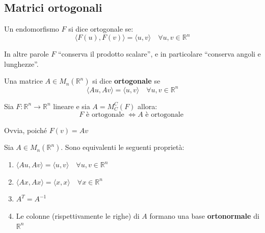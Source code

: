 \documentclass[
  a4paper,
]{article}
\providecommand{\tightlist}{%
  \setlength{\itemsep}{0pt}\setlength{\parskip}{0pt}}
\providecommand{\tightlist}{}
\begin{document}
\hypertarget{matrici-ortogonali}{%
\subsection{Matrici ortogonali}\label{matrici-ortogonali}}

\begin{definitionbox}
Un endomorfismo \(F\) si dice ortogonale se: \[
\langle F(u), F(v) \rangle = \langle u, v \rangle \quad \forall u, v \in \mathbb{R}^n
\]
\end{definitionbox}

In altre parole \(F\) ``conserva il prodotto scalare'', e in particolare
``conserva angoli e lunghezze''.

\begin{definitionbox}
Una matrice \(A \in M_n (\mathbb{R}^n)\) si dice \textbf{ortogonale} se
\[
\langle Au, Av \rangle = \langle u, v \rangle \quad \forall u, v \in \mathbb{R}^n
\]
\end{definitionbox}

\begin{propositionbox}
Sia \(F: \mathbb{R}^n \to \mathbb{R}^n\) lineare e sia \(A = M_C^C(F)\)
allora: \[
F \text{ è ortogonale } \iff A \text { è ortogonale }
\]
\end{propositionbox}

\begin{proofbox}
Ovvia, poiché \(F(v) = Av\)
\end{proofbox}

\begin{propositionbox}
Sia \(A \in M_n (\mathbb{R}^n)\). Sono equivalenti le seguenti
proprietà:

\begin{enumerate}
\def\labelenumi{\arabic{enumi}.}
\tightlist
\item
  \(\langle Au, Av \rangle = \langle u, v \rangle \quad \forall u, v \in \mathbb{R}^n\)
\item
  \(\langle Ax, Ax \rangle = \langle x, x \rangle \quad \forall x \in \mathbb{R}^n\)
\item
  \(A^T = A^{-1}\)
\item
  Le colonne (rispettivamente le righe) di \(A\) formano una base
  \textbf{ortonormale} di \(\mathbb{R}^n\)
\end{enumerate}
\end{propositionbox}
\end{document}
